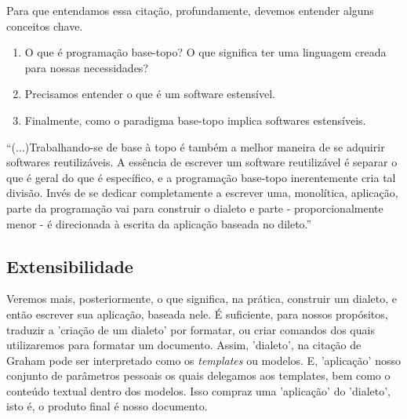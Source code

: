 \documentclass[12pt, brazilian, a5paper]{abntex2} %
\begin{document}
Para que entendamos essa citação, profundamente, devemos entender alguns conceitos chave.

\begin{enumerate}
\item O que é programação base-topo? O que significa ter uma linguagem creada para nossas necessidades?

\item Precisamos entender o que é um software estensível.

\item Finalmente, como o paradigma base-topo implica softwares estensíveis.
\end{enumerate}




``(...)Trabalhando-se de base à topo é também a melhor maneira de se adquirir softwares reutilizáveis. A essência de escrever um software reutilizável é separar o que é geral do que é específico, e a programação base-topo inerentemente cria tal divisão. Invés de se dedicar completamente a escrever uma, monolítica, aplicação, parte da programação vai para construir o dialeto e parte - proporcionalmente menor - é direcionada à escrita da aplicação baseada no dileto.'' \cite{graham1995}

\clearpage
\subsection{Extensibilidade} 
Veremos mais, posteriormente, o que significa, na prática, construir um dialeto, e então escrever sua aplicação, baseada nele. É suficiente, para nossos propósitos, traduzir a 'criação de um dialeto' por formatar, ou criar comandos dos quais utilizaremos para formatar um documento. Assim, 'dialeto', na citação de Graham pode ser interpretado como os \textit{templates} ou modelos. E, 'aplicação' nosso conjunto de parâmetros pessoais os quais delegamos aos templates, bem como o conteúdo textual dentro dos modelos. Isso compraz uma 'aplicação' do 'dialeto', isto é, o produto final é nosso documento.
\end{document}
